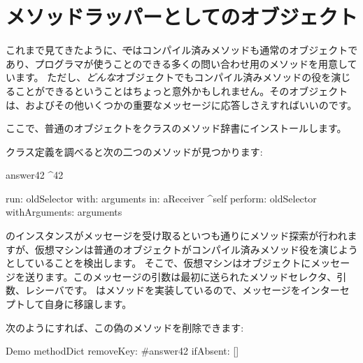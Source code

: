 \documentclass[a4paper,10pt,twoside]{book}
\begin{document}
\section{メソッドラッパーとしてのオブジェクト}

これまで見てきたように、\st ではコンパイル済みメソッドも通常のオブジェクトであり、プログラマが使うことのできる多くの問い合わせ用のメソッドを用意しています。
ただし、\emph{どんな}オブジェクトでもコンパイル済みメソッドの役を演じることができるということはちょっと意外かもしれません。そのオブジェクトは、およびその他いくつかの重要なメッセージに応答しさえすればいいのです。


ここで、普通のオブジェクトをクラスのメソッド辞書にインストールします。


クラス定義を調べると次の二つのメソッドが見つかります:
\begin{code}{}
answer42
	^42

run: oldSelector with: arguments in: aReceiver
	^self perform: oldSelector withArguments: arguments
\end{code}

のインスタンスがメッセージを受け取るといつも通りにメソッド探索が行われますが、仮想マシンは普通のオブジェクトがコンパイル済みメソッド役を演じようとしていることを検出します。
そこで、仮想マシンはオブジェクトにメッセージを送ります。このメッセージの引数は最初に送られたメソッドセレクタ、引数、レシーバです。
はメソッドを実装しているので、メッセージをインターセプトして自身に移譲します。

次のようにすれば、この偽のメソッドを削除できます:
\begin{code}{}
Demo methodDict removeKey: #answer42 ifAbsent: []
\end{code}
\end{document}
